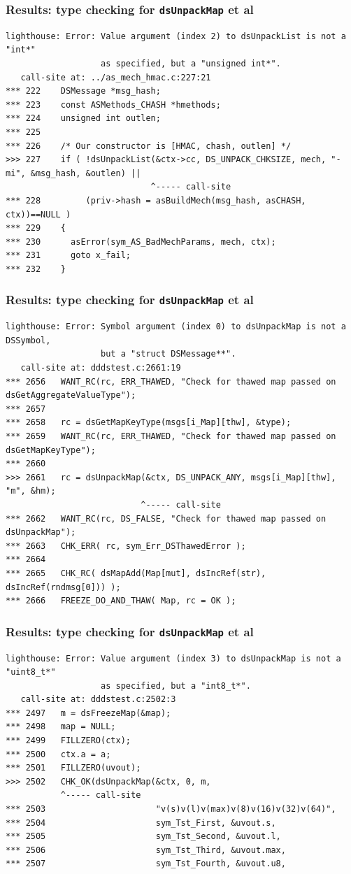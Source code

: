 \documentclass{beamer}
\begin{document}
\begin{frame}[fragile]
  \frametitle{Results: type checking for \texttt{dsUnpackMap} et al}
\tiny \begin{verbatim}
lighthouse: Error: Value argument (index 2) to dsUnpackList is not a "int*"
                   as specified, but a "unsigned int*".
   call-site at: ../as_mech_hmac.c:227:21
*** 222    DSMessage *msg_hash;
*** 223    const ASMethods_CHASH *hmethods;
*** 224    unsigned int outlen;
*** 225    
*** 226    /* Our constructor is [HMAC, chash, outlen] */
>>> 227    if ( !dsUnpackList(&ctx->cc, DS_UNPACK_CHKSIZE, mech, "-mi", &msg_hash, &outlen) ||
                             ^----- call-site
*** 228         (priv->hash = asBuildMech(msg_hash, asCHASH, ctx))==NULL )
*** 229    {
*** 230      asError(sym_AS_BadMechParams, mech, ctx);
*** 231      goto x_fail;
*** 232    }
\end{verbatim}
\end{frame}

\begin{frame}[fragile]
  \frametitle{Results: type checking for \texttt{dsUnpackMap} et al}
\tiny \begin{verbatim}
lighthouse: Error: Symbol argument (index 0) to dsUnpackMap is not a DSSymbol,
                   but a "struct DSMessage**".
   call-site at: dddstest.c:2661:19
*** 2656   WANT_RC(rc, ERR_THAWED, "Check for thawed map passed on dsGetAggregateValueType");
*** 2657 
*** 2658   rc = dsGetMapKeyType(msgs[i_Map][thw], &type);
*** 2659   WANT_RC(rc, ERR_THAWED, "Check for thawed map passed on dsGetMapKeyType");
*** 2660 
>>> 2661   rc = dsUnpackMap(&ctx, DS_UNPACK_ANY, msgs[i_Map][thw], "m", &hm);
                           ^----- call-site
*** 2662   WANT_RC(rc, DS_FALSE, "Check for thawed map passed on dsUnpackMap");
*** 2663   CHK_ERR( rc, sym_Err_DSThawedError );
*** 2664 
*** 2665   CHK_RC( dsMapAdd(Map[mut], dsIncRef(str), dsIncRef(rndmsg[0])) );
*** 2666   FREEZE_DO_AND_THAW( Map, rc = OK );
\end{verbatim}
\end{frame}

\begin{frame}[fragile]
  \frametitle{Results: type checking for \texttt{dsUnpackMap} et al}
\tiny \begin{verbatim}
lighthouse: Error: Value argument (index 3) to dsUnpackMap is not a "uint8_t*"
                   as specified, but a "int8_t*".
   call-site at: dddstest.c:2502:3
*** 2497   m = dsFreezeMap(&map);
*** 2498   map = NULL;
*** 2499   FILLZERO(ctx);
*** 2500   ctx.a = a;
*** 2501   FILLZERO(uvout);
>>> 2502   CHK_OK(dsUnpackMap(&ctx, 0, m,
           ^----- call-site
*** 2503                      "v(s)v(l)v(max)v(8)v(16)v(32)v(64)",
*** 2504                      sym_Tst_First, &uvout.s,
*** 2505                      sym_Tst_Second, &uvout.l,
*** 2506                      sym_Tst_Third, &uvout.max,
*** 2507                      sym_Tst_Fourth, &uvout.u8,
\end{verbatim}
\end{frame}
\end{document}
